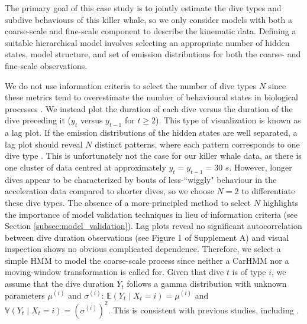 The primary goal of this case study is to jointly estimate the dive types and subdive behaviours of this killer whale, so we only consider models with both a coarse-scale and fine-scale component to describe the kinematic data. Defining a suitable hierarchical model involves selecting an appropriate number of hidden states, model structure, and set of emission distributions for both the coarse- and fine-scale observations.

We do not use information criteria to select the number of dive types $N$ since these metrics tend to overestimate the number of behavioural states in biological processes \citep{Pohle:2017}. We instead plot the duration of each dive versus the duration of the dive preceding it ($y_t$ versus $y_{t-1}$ for $t \geq 2$). This type of visualization is known as a lag plot. If the emission distributions of the hidden states are well separated, a lag plot should reveal $N$ distinct patterns, where each pattern corresponds to one dive type \citep{Lawler:2019}. This is unfortunately not the case for our killer whale data, as there is one cluster of data centred at approximately $y_t = y_{t-1} = 30$ $s$. However, longer dives appear to be characterized by bouts of less-``wiggly" behaviour in the acceleration data compared to shorter dives, so we choose $N = 2$ to differentiate these dive types. The absence of a more-principled method to select $N$ highlights the importance of model validation techniques in lieu of information criteria (see Section \ref{subsec:model_validation}).
%
Lag plots reveal no significant autocorrelation between dive duration observations (see Figure 1 of Supplement A) and visual inspection shows no obvious complicated dependence. Therefore, we select a simple HMM to model the coarse-scale process since neither a CarHMM nor a moving-window transformation is called for.
%
Given that dive $t$ is of type $i$, we assume that the dive duration $Y_t$ follows a gamma distribution with unknown parameters $\mu^{(i)}$ and $\sigma^{(i)}$: $\mathbb{E}(Y_t \mid X_t = i) = \mu^{(i)}$ and $\mathbb{V}(Y_t \mid X_t = i) = \left(\sigma^{(i)}\right)^2$. This is consistent with previous studies, including \citet{Barajas:2017}. 
%

